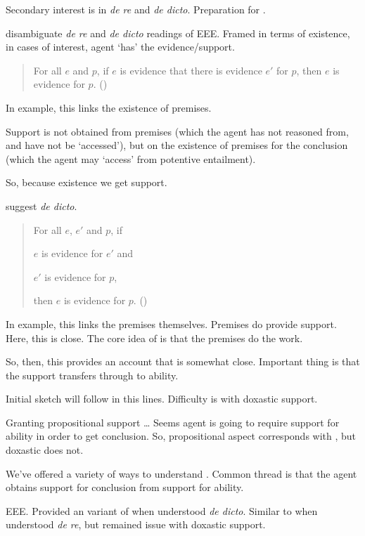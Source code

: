 \begin{note}
  Secondary interest is in \emph{de re} and \emph{de dicto}.
  Preparation for \WR{}.

  \citeauthor{Tal:2017uw} disambiguate \emph{de re} and \emph{de dicto} readings of EEE.
  Framed in terms of existence, in cases of interest, agent `has' the evidence/support.

  \begin{quote}
    For all \(e\) and \(p\), if \(e\) is evidence that there is evidence \(e'\) for \(p\), then \(e\) is evidence for \(p\).\nolinebreak
    \mbox{}\hfill\mbox{(\citeyear[8]{Tal:2017uw})}
  \end{quote}
  In example, this links the existence of premises.

  Support is not obtained from premises (which the agent has not reasoned from, and have not be `accessed'), but on the existence of premises for the conclusion (which the agent may `access' from potentive entailment).

  So, because existence we get support.

  \citeauthor{Tal:2017uw} suggest \emph{de dicto}.
  \begin{quote}
    For all \(e\), \(e'\) and \(p\), if
    \begin{enumerate*}[label=(\roman*), ref=(\roman*)]
    \item \(e\) is evidence for \(e'\) and
    \item \(e'\) is evidence for \(p\),
    \end{enumerate*}
    then \(e\) is evidence for \(p\).\nolinebreak
    \mbox{}\hfill\mbox{(\citeyear[8]{Tal:2017uw})}
  \end{quote}
  In example, this links the premises themselves.
  Premises do provide support.
  Here, this is close.
  The core idea of \WR{} is that the premises do the work.

  So, then, this provides an account that is somewhat close.
  Important thing is that the support transfers through to ability.

  Initial sketch will follow in this lines.
  Difficulty is with doxastic support.

  Granting propositional support \dots
  Seems agent is going to require support for ability in order to get conclusion.
  So, propositional aspect corresponds with \WR{}, but doxastic does not.
\end{note}

\begin{note}
  We've offered a variety of ways to understand \AR{}.
  Common thread is that the agent obtains support for conclusion from support for ability.

  EEE.
  Provided an variant of \AR{} when understood \emph{de dicto}.
  Similar to \WR{} when understood \emph{de re}, but remained issue with doxastic support.
\end{note}

